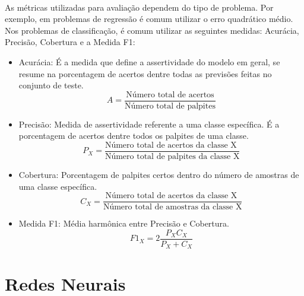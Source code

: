 \documentclass[grad,numbers]{coppe}
\begin{document}
				\paragraph{}As métricas utilizadas para avaliação dependem do tipo de problema. Por exemplo, em problemas de regressão é comum utilizar o erro quadrático médio\cite{regression-loss}. Nos problemas de classificação, é comum utilizar as seguintes medidas: Acurácia, Precisão, Cobertura e a Medida F1:
				\begin{itemize}
					\item Acurácia: É a medida que define a assertividade do modelo em geral, se resume na porcentagem de acertos dentre todas as previsões feitas no conjunto de teste.
					\begin{equation*}
						A = \frac{\text{Número total de acertos}}{\text{Número total de palpites}}
					\end{equation*}
					\item Precisão: Medida de assertividade referente a uma classe específica. É a porcentagem de acertos dentre todos os palpites de uma classe.
					\begin{equation*}
						P_X = \frac{\text{Número total de acertos da classe X }}{\text{Número total de palpites da classe X}}
					\end{equation*}
					\item Cobertura: Porcentagem de palpites certos dentro do número de amostras de uma classe específica.
					\begin{equation*}
						C_X = \frac{\text{Número total de acertos da classe X }}{\text{Número total de amostras da classe X}}
					\end{equation*}
					\item  Medida F1: Média harmônica entre Precisão e Cobertura.
					\begin{equation*}
					F1_X = 2\frac{P_X C_X}{P_X + C_X}
					\end{equation*}
				\end{itemize}
  
  \section{Redes Neurais}
\end{document}
